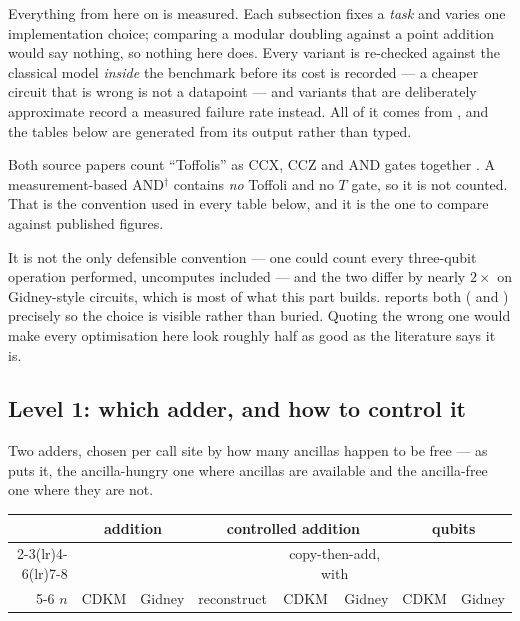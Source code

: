 Everything from here on is measured. Each subsection fixes a \emph{task} and varies one
implementation choice; comparing a modular doubling against a point addition would say nothing, so
nothing here does. Every variant is re-checked against the classical model \emph{inside} the
benchmark before its cost is recorded --- a cheaper circuit that is wrong is not a datapoint ---
and variants that are deliberately approximate record a measured failure rate instead. All of it
comes from , and the tables below are generated from its output rather
than typed.

\begin{keybox}[title={Which Toffoli count, and why it matters here more than in Part V}]
Both source papers count ``Toffolis'' as CCX, CCZ and AND gates together
\cite{ec:schrott26}. A measurement-based AND$^\dagger$ contains \emph{no} Toffoli and no $T$ gate,
so it is not counted. That is the convention used in every table below, and it is the one to
compare against published figures.

It is not the only defensible convention --- one could count every three-qubit operation performed,
uncomputes included --- and the two differ by nearly $2\times$ on Gidney-style circuits, which is
most of what this part builds.  reports both ( and
) precisely so the choice is visible rather than buried. Quoting the wrong one
would make every optimisation here look roughly half as good as the literature says it is.
\end{keybox}

\subsection{Level 1: which adder, and how to control it}\label{ec:sec:fastadd}

Two adders, chosen per call site by how many ancillas happen to be free --- as \cite{ec:schrott26}
puts it, the ancilla-hungry one where ancillas are available and the ancilla-free one where they
are not.

\begin{center}\small
\begin{tabular}{@{}rrrrrrrr@{}}
\toprule
& \multicolumn{2}{c}{addition} & \multicolumn{3}{c}{controlled addition} & \multicolumn{2}{c}{qubits}\\
\cmidrule(lr){2-3}\cmidrule(lr){4-6}\cmidrule(lr){7-8}
& & & & \multicolumn{2}{c}{copy-then-add, with} & & \\
\cmidrule(lr){5-6}
$n$ & CDKM & Gidney & reconstruct & CDKM & Gidney & CDKM & Gidney\\
\midrule
\bottomrule
\end{tabular}
\end{center}

